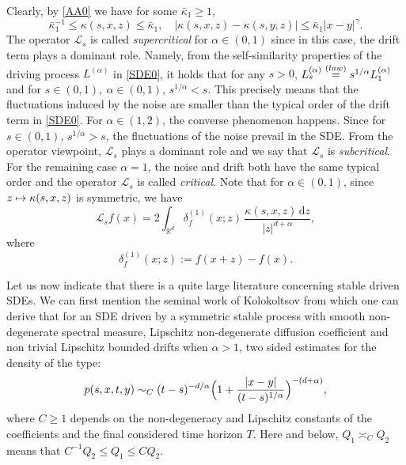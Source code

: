 \documentclass[11pt]{article}
\numberwithin{equation}{section}\providecommand{\asymp}{\mathrel{\sim}}
\def\mto{\mathchoice{\longmapsto}{\mapsto}{\mapsto}{\mapsto}}
\theoremstyle{plain}
\theoremstyle{definition}
\newcommand\cL{{\mathcal L}}
\newcommand\mR{\mathbb{R}}
\newcommand\1{{\mathbf{1}}}
\newcommand\sL{{\mathscr L}}
\newcommand{\dif}{\,\mathrm{d}}
\begin{document}
Clearly, by \eqref{AA0} we have for some $\bar\kappa_1\geq 1$,
\begin{equation}\label{AA2}
\bar\kappa^{-1}_1\leq \kappa(s,x,z)\leq\bar\kappa_1,\quad |\kappa(s,x,z)-\kappa(s,y,z)|\leq\bar\kappa_1|x-y|^{\gamma}.
\end{equation}
The operator $\sL_{s}$ is called \textit{supercritical} for $\alpha\in(0,1)$ since in this case, the drift term plays a dominant role. Namely, from the self-similarity properties of the driving process $L^{(\alpha)}$ in \eqref{SDE0}, it holds that for any $s>0$, $L_s^{(\alpha)} \overset{({\rm law})}{=} s^{1/\alpha}L_1^{(\alpha)} $ and for $s\in (0,1),\ \alpha\in (0,1)$, $s^{1/\alpha}< s $. This precisely means that the fluctuations induced by the noise are smaller than the typical order of the drift term in \eqref{SDE0}.
For $\alpha\in(1,2)$, the converse phenomenon happens. Since for $s\in (0,1) $, $s^{1/\alpha}>s $, the fluctuations of the noise prevail in the SDE. From the operator viewpoint, $\cL_{s}$ plays a dominant role and we say that $\sL_{s}$ is \textit{subcritical}. For the remaining case $\alpha=1$, the noise and drift both have the same typical order and the operator $\sL_{s}$ is called \textit{critical}.
Note that for $\alpha\in(0,1)$, since $z\mto\kappa(s,x,z)$ is symmetric, we have
\[
\cL_{s} f(x)=2\int_{\mR^d}\delta^{(1)}_f(x;z)\,\frac{\kappa(s,x,z)\dif z}{|z|^{d+\alpha}},
\]
where
\[
\delta^{(1)}_f(x;z):=f(x+z)-f(x).
\]

Let us now indicate that there is a quite large literature concerning stable driven SDEs. We can first mention the seminal work of Kolokoltsov \cite{kolo:00} {from which one can derive} that for an SDE driven by a symmetric stable process with smooth non-degenerate spectral measure, Lipschitz non-degenerate diffusion coefficient and non trivial Lipschitz bounded drifts when $\alpha>1 $, two sided estimates for the density of the type:
\begin{equation}\label{FIRST_TW}
p(s,x,t,y)\asymp_C (t-s)^{-d/\alpha} \Bigl(1+\frac{|x-y|}{(t-s)^{1/\alpha}}\Bigr)^{-(d+\alpha)},
\end{equation}
where $C\ge 1$ depends on the non-degeneracy and Lipschitz constants of the coefficients and the final considered time horizon $T$.
Here and below, $Q_1\asymp_C Q_2$ means that $C^{-1}Q_2\leq Q_1\leq C Q_2$.
\end{document}
